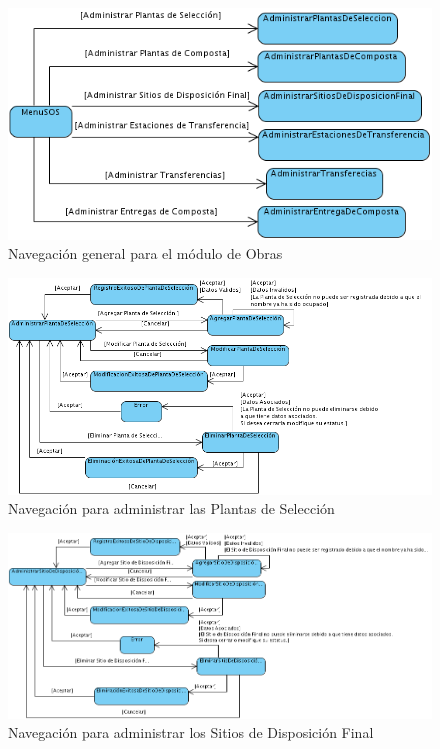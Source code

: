 	\begin{figure}[h!]
		\centering
			\includegraphics[scale=0.5]{images/Navegacion/Navegacion.png}
		\caption{Navegación general para el módulo de Obras}
	\end{figure}

	\begin{figure}[h!]
		\centering
			\includegraphics[scale=0.5]{images/Navegacion/AdministrarPlantasDeSeleccion.png}
		\caption{Navegación para administrar las Plantas de Selección}
	\end{figure}
\newpage
	\begin{figure}[h!]
		\centering
			\includegraphics[scale=0.5]{images/Navegacion/AdministrarSitiosDeDisposicionFinal.png}
		\caption{Navegación para administrar los Sitios de Disposición Final}
	\end{figure}

